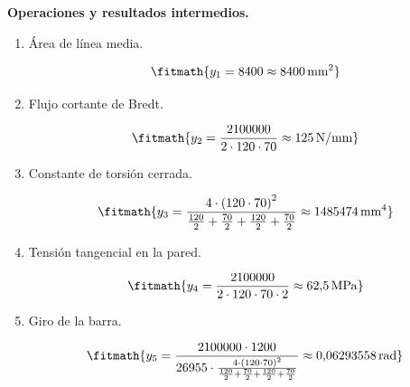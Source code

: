 \noindent\textbf{Operaciones y resultados intermedios.}

\begin{enumerate}

\item Área de línea media.

\[\fitmath{y_{1}=8400\approx 8400\,\mathrm{mm^{2}}}\]

\item Flujo cortante de Bredt.

\[\fitmath{y_{2}=\frac{2100000}{2\cdot 120\cdot 70}\approx 125\,\mathrm{N/mm}}\]

\item Constante de torsión cerrada.

\[\fitmath{y_{3}=\frac{4\cdot {\left(120\cdot 70\right)}^{2}}{\frac{120}{2}+\frac{70}{2}+\frac{120}{2}+\frac{70}{2}}\approx 1485474\,\mathrm{mm^{4}}}\]

\item Tensión tangencial en la pared.

\[\fitmath{y_{4}=\frac{2100000}{2\cdot 120\cdot 70\cdot 2}\approx 62{,}5\,\mathrm{MPa}}\]

\item Giro de la barra.

\[\fitmath{y_{5}=\frac{2100000\cdot 1200}{26955\cdot \frac{4\cdot {\left(120\cdot 70\right)}^{2}}{\frac{120}{2}+\frac{70}{2}+\frac{120}{2}+\frac{70}{2}}}\approx 0{,}06293558\,\mathrm{rad}}\]

\end{enumerate}
